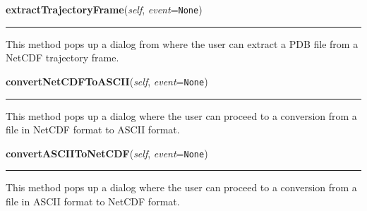 \hspace{.8\funcindent}\begin{boxedminipage}{\funcwidth}

    \raggedright \textbf{extractTrajectoryFrame}(\textit{self}, \textit{event}={\tt None})

    \vspace{-1.5ex}

    \rule{\textwidth}{0.5\fboxrule}
\setlength{\parskip}{2ex}
    This method pops up a dialog from where the user can extract a PDB file
    from a NetCDF trajectory frame.

\setlength{\parskip}{1ex}
    \end{boxedminipage}

    \label{nMOLDYN:GUI:MainDialog:MainDialog:convertNetCDFToASCII}

    \vspace{0.5ex}

\hspace{.8\funcindent}\begin{boxedminipage}{\funcwidth}

    \raggedright \textbf{convertNetCDFToASCII}(\textit{self}, \textit{event}={\tt None})

    \vspace{-1.5ex}

    \rule{\textwidth}{0.5\fboxrule}
\setlength{\parskip}{2ex}
    This method pops up a dialog where the user can proceed to a conversion
    from a file in NetCDF format to ASCII format.

\setlength{\parskip}{1ex}
    \end{boxedminipage}

    \label{nMOLDYN:GUI:MainDialog:MainDialog:convertASCIIToNetCDF}

    \vspace{0.5ex}

\hspace{.8\funcindent}\begin{boxedminipage}{\funcwidth}

    \raggedright \textbf{convertASCIIToNetCDF}(\textit{self}, \textit{event}={\tt None})

    \vspace{-1.5ex}

    \rule{\textwidth}{0.5\fboxrule}
\setlength{\parskip}{2ex}
    This method pops up a dialog where the user can proceed to a conversion
    from a file in ASCII format to NetCDF format.

\setlength{\parskip}{1ex}
    \end{boxedminipage}

